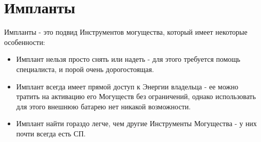 \section{Импланты}
Импланты - это подвид Инструментов могущества, который имеет некоторые особенности:
\begin{itemize}
\item Имплант нельзя просто снять или надеть - для этого требуется помощь специалиста, и порой очень дорогостоящая.
\item Имплант всегда имеет прямой доступ к Энергии владельца - ее можно тратить на активацию его Могуществ без ограничений, однако использовать для этого внешнюю батарею нет никакой возможности.
\item Имплант найти гораздо легче, чем другие Инструменты Могущества - у них почти всегда есть СП.
\end{itemize}

